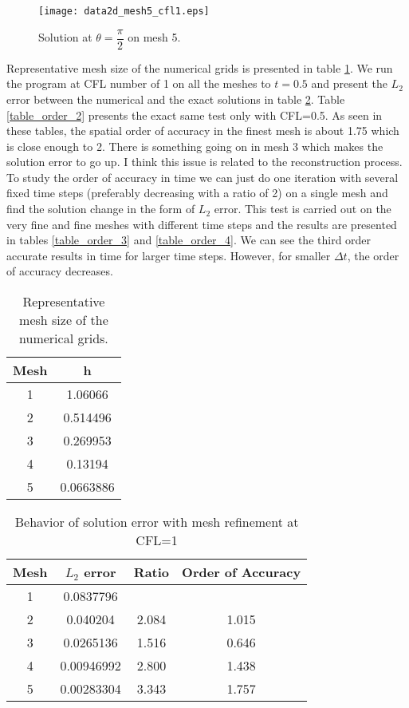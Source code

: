 \documentclass{article}
\begin{document}
\begin{figure}[H]
\centering
\texttt{[image: data2d\_mesh5\_cfl1.eps]}
\caption{Solution at $\theta=\dfrac{\pi}{2}$ on mesh 5.}
\label{fig_2d_mesh5_1}
\end{figure}

Representative mesh size of the numerical grids is presented in table \ref{table_representative_mesh_1}. We run the program at CFL number of 1 on all the meshes to $t=0.5$ and present the $L_2$ error between the numerical and the exact solutions in table \ref{table_order_1}. Table \ref{table_order_2} presents the exact same test only with CFL=0.5. As seen in these tables, the spatial order of accuracy in the finest mesh is about 1.75 which is close enough to 2. There is something going on in mesh 3 which makes the solution error to go up. I think this issue is related to the reconstruction process. To study the order of accuracy in time we can just do one iteration with several fixed time steps (preferably decreasing with a ratio of 2) on a single mesh and find the solution change in the form of $L_2$ error. This test is carried out on the very fine and fine meshes with different time steps and the results are presented in tables \ref{table_order_3} and \ref{table_order_4}. We can see the third order accurate results in time for larger time steps. However, for smaller $\Delta t$, the order of accuracy decreases.

\begin{table}[H]
\centering
\caption{Representative mesh size of the numerical grids.}
\label{table_representative_mesh_1}
\vspace{10pt}
\begin{tabular}{cc}
\hline
Mesh & h \\
\hline\hline
1 & 1.06066 \\
2 & 0.514496 \\
3 & 0.269953 \\
4 & 0.13194 \\
5 & 0.0663886 \\
\hline
\end{tabular}
\end{table}

\begin{table}[H]
\centering
\caption{Behavior of solution error with mesh refinement at CFL=1}
\label{table_order_1}
\vspace{10pt}
\begin{tabular}{cccc}
\hline
Mesh & $L_2$ error & Ratio & Order of Accuracy\\
\hline\hline
1 & 0.0837796  &       &       \\
2 & 0.040204   & 2.084 & 1.015 \\
3 & 0.0265136  & 1.516 & 0.646 \\
4 & 0.00946992 & 2.800 & 1.438 \\
5 & 0.00283304 & 3.343 & 1.757 \\
\hline
\end{tabular}
\end{table}
\end{document}
